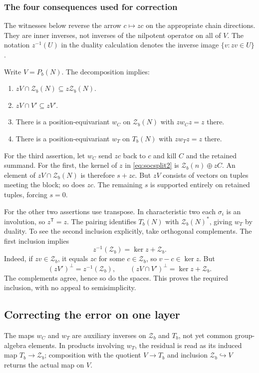 \documentclass[11pt,a4paper]{article}
\theoremstyle{definition}\newtheorem{definition}[theorem]{Definition}
\theoremstyle{remark}\newtheorem{remark}[theorem]{Remark}
\begin{document}
\subsubsection{The four consequences used for correction}
The witnesses below reverse the arrow $c\mapsto zc$ on the appropriate
chain directions. They are inner inverses, not inverses of the
nilpotent operator on all of $V$. The notation $z^{-1}(U)$ in the
duality calculation denotes the inverse image $\{v:zv\in U\}$.

Write $V=P_b(N)$. The decomposition implies:
\begin{enumerate}
\item $zV\cap \mathcal Z_b(N)\subseteq z\mathcal Z_b(N)$.
\item $zV\cap V'\subseteq zV'$.
\item There is a position-equivariant $w_C$ on $\mathcal Z_b(N)$ with $zw_Cz=z$ there.
\item There is a position-equivariant $w_T$ on $T_b(N)$ with $zw_Tz=z$ there.
\end{enumerate}
For the third assertion, let $w_C$ send $zc$ back to $c$ and kill $C$ and the retained summand. For the first, the kernel of $z$ in \eqref{eq:socsplit2} is $\mathcal Z_b(n)\oplus zC$. An element of $zV\cap \mathcal Z_b(N)$ is therefore $s+zc$. But $zV$ consists of vectors on tuples meeting the block; so does $zc$. The remaining $s$ is supported entirely on retained tuples, forcing $s=0$.

For the other two assertions use transpose. In characteristic two each $\sigma_i$ is an involution, so $z^{\mathsf T}=z$. The pairing identifies $T_b(N)$ with $\mathcal Z_b(N)^*$, giving $w_T$ by duality. To see the second inclusion explicitly, take orthogonal complements. The first inclusion implies
\[z^{-1}(\mathcal Z_b)=\ker z+\mathcal Z_b.
\]
Indeed, if $zv\in \mathcal Z_b$, it equals $zc$ for some $c\in \mathcal Z_b$, so $v-c\in\ker z$. But
\[(zV')^\perp=z^{-1}(\mathcal Z_b),\qquad
(zV\cap V')^\perp=\ker z+\mathcal Z_b.
\]
The complements agree, hence so do the spaces. This proves the required inclusion, with no appeal to semisimplicity.

\subsection{Correcting the error on one layer}\label{sec:layerstep}
The maps $w_C$ and $w_T$ are auxiliary inverses on $\mathcal Z_b$
and $T_b$, not yet common group-algebra elements. In products involving
$w_T$, the residual is read as its induced map $T_b\to\mathcal Z_b$;
composition with the quotient $V\to T_b$ and inclusion
$\mathcal Z_b\hookrightarrow V$ returns the actual map on $V$.
\end{document}
